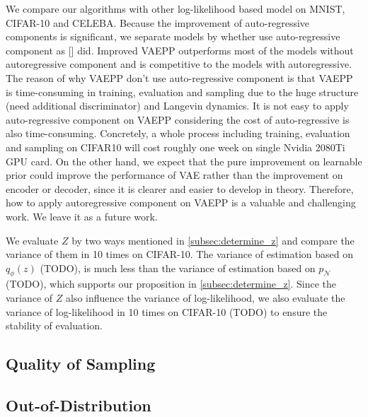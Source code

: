 We compare our algorithms with other log-likelihood based model on MNIST, CIFAR-10 and CELEBA. Because the improvement of auto-regressive components is significant, we separate models by whether use auto-regressive component as [] did. Improved VAEPP outperforms most of the models without autoregressive component and is competitive to the models with autoregressive. The reason of why VAEPP don't use auto-regressive component is that VAEPP is time-consuming in training,  evaluation and sampling due to the huge structure (need additional discriminator) and Langevin dynamics. It is not easy to apply auto-regressive component on VAEPP considering the cost of auto-regressive is also time-consuming. Concretely, a whole process including training, evaluation and sampling on CIFAR10 will cost roughly one week on single Nvidia 2080Ti GPU card. On the other hand, we expect that the pure improvement on learnable prior could improve the performance of VAE rather than the improvement on encoder or decoder, since it is clearer and easier to develop in theory. Therefore, how to apply autoregressive component on VAEPP is a valuable and challenging work. We leave it as a future work.

We evaluate $Z$ by two ways mentioned in \cref{subsec:determine_z} and compare the variance of them in 10 times on CIFAR-10. The variance of estimation based on $q_\phi(z)$ (TODO), is much less than the variance of estimation based on $p_\mathcal{N}$ (TODO), which supports our proposition in \cref{subsec:determine_z}. Since the variance of $Z$ also influence the variance of log-likelihood, we also evaluate the variance of log-likelihood in 10 times on CIFAR-10 (TODO) to ensure the stability of evaluation. 

\subsection{Quality of Sampling}


\subsection{Out-of-Distribution}


